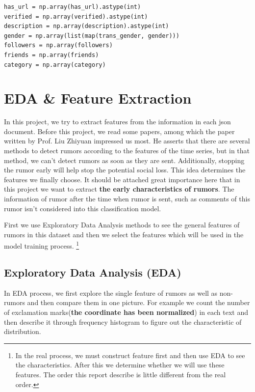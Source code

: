 \documentclass[12pt,a4paper]{article}
\begin{document}
\begin{lstlisting}
has_url = np.array(has_url).astype(int)
verified = np.array(verified).astype(int)
description = np.array(description).astype(int)
gender = np.array(list(map(trans_gender, gender)))
followers = np.array(followers)
friends = np.array(friends)
category = np.array(category)
\end{lstlisting}
\clearpage
\section{EDA \& Feature Extraction}
In this project, we try to extract features from the information in each json document. Before this project, we read some papers, among which the paper written by Prof. Liu Zhiyuan impressed us most. He asserts that there are several methods to detect rumors according to the features of the time series, but in that method, we can't detect rumors as soon as they are sent. Additionally, stopping the rumor early will help stop the potential social loss. This idea determines the features we finally choose. It should be attached great importance here that in this project we want to extract \textbf{the early characteristics of rumors}. The information of rumor after the time when rumor is sent, such as comments of this rumor isn't considered into this classification model.

First we use Exploratory Data Analysis methods to see the general features of rumors in this dataset and then we select the features which will be used in the model training process. \footnote{In the real process, we must construct feature first and then use EDA to see the characteristics. After this we determine whether we will use these features. The order this report describe is little different from the real order.}
\subsection{Exploratory Data Analysis (EDA)}
In EDA process, we first explore the single feature of rumors as well as non-rumors and then compare them in one picture. For example we count the number of exclamation marks(\textbf{the coordinate has been normalized}) in each text and then describe it through frequency histogram to figure out the characteristic of distribution.
\end{document}
